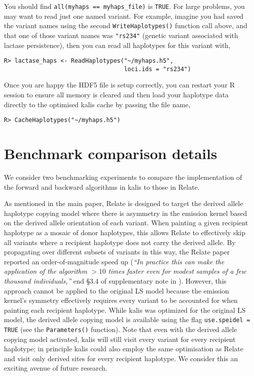 \documentclass[a4paper]{article}
\let\proglang=\textsf
\newcommand{\pkg}[1]{{\fontseries{m}\fontseries{b}\selectfont #1}}
\begin{document}
You should find \texttt{all(myhaps\ ==\ myhaps\_file)} is \texttt{TRUE}.
For large problems, you may want to read just one named variant.
For example, imagine you had saved the variant names using the second \texttt{WriteHaplotypes()} function call above, and that one of those variant names was \texttt{"rs234"} (genetic variant associated with lactase persistence), then you can read all haplotypes for this variant with,

\begin{verbatim}
R> lactase_haps <- ReadHaplotypes("~/myhaps.h5",
                                  loci.ids = "rs234")
\end{verbatim}

Once you are happy the HDF5 file is setup correctly, you can restart your \proglang{R} session to ensure all memory is cleared and then load your haplotype data directly to the optimised \pkg{kalis} cache by passing the file name,

\begin{verbatim}
R> CacheHaplotypes("~/myhaps.h5")
\end{verbatim}


\section{Benchmark comparison details}
\label{benchmark-details}

We consider two benchmarking experiments to compare the implementation of the forward and backward algorithms in \pkg{kalis} to those in Relate.

As mentioned in the main paper, Relate is designed to target the derived allele haplotype copying model where there is asymmetry in the emission kernel based on the derived allele orientation of each variant.
When painting a given recipient haplotype as a mosaic of donor haplotypes, this allows Relate to effectively skip all variants where a recipient haplotype does not carry the derived allele.
By propagating over different subsets of variants in this way, the Relate paper reported an order-of-magnitude speed up (\textit{``In practice this can make the application of the algorithm $>10$ times faster even for modest samples of a few thousand individuals,''} end \S3.4 of supplementary note in \cite{speidel}).
However, this approach cannot be applied to the original LS model because the emission kernel's symmetry effectively requires every variant to be accounted for when painting each recipient haplotype.
While \pkg{kalis} was optimized for the original LS model, the derived allele copying model is available using the flag \texttt{use.speidel = TRUE} (see the \texttt{Parameters()} function).
Note that even with the derived allele copying model activated, \pkg{kalis} will still visit every variant for every recipient haplotype; in principle \pkg{kalis} could also employ the same optimisation as Relate and visit only derived sites for every recipient haplotype.
We consider this an exciting avenue of future research.
\end{document}
